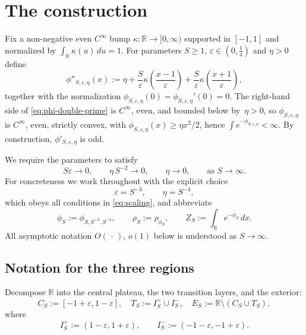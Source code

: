 \section{The construction}

Fix a non-negative even $C^\infty$ bump
$\kappa:\mathbb R\to[0,\infty)$ supported in $[-1,1]$ and normalized by
$\int_{\mathbb R}\kappa(u)\,du=1$. For parameters $S\ge 1$,
$\varepsilon\in(0,\tfrac14)$ and $\eta>0$ define
\begin{equation}\label{eq:phi-double-prime}
  \phi''_{S,\varepsilon,\eta}(x)
  :=\eta
  +\frac{S}{\varepsilon}\kappa\!\left(\frac{x-1}{\varepsilon}\right)
  +\frac{S}{\varepsilon}\kappa\!\left(\frac{x+1}{\varepsilon}\right),
\end{equation}
together with the normalization $\phi_{S,\varepsilon,\eta}(0)
=\phi_{S,\varepsilon,\eta}'(0)=0$. The right-hand side of
\eqref{eq:phi-double-prime} is $C^\infty$, even, and bounded below by~$\eta>0$,
so $\phi_{S,\varepsilon,\eta}$ is $C^\infty$, even, strictly convex, with
$\phi_{S,\varepsilon,\eta}(x)\ge\eta x^2/2$, hence
$\int e^{-\phi_{S,\varepsilon,\eta}}<\infty$. By construction,
$\phi'_{S,\varepsilon,\eta}$ is odd.

We require the parameters to satisfy
\begin{equation}\label{eq:scaling}
  S\varepsilon\to 0,\qquad \eta\,S^{-2}\to 0,\qquad \eta\to 0,
  \qquad\text{as }S\to\infty.
\end{equation}
For concreteness we work throughout with the explicit choice
\begin{equation}\label{eq:specific-choice}
  \varepsilon = S^{-3},\qquad \eta = S^{-4},
\end{equation}
which obeys all conditions in \eqref{eq:scaling}, and abbreviate
\[
  \phi_S:=\phi_{S,S^{-3},S^{-4}},\qquad
  \rho_S:=\rho_{\phi_S},\qquad
  Z_S:=\int_{\mathbb R}e^{-\phi_S}\,dx.
\]
All asymptotic notation $O(\,\cdot\,)$, $o(1)$ below is understood as
$S\to\infty$.

\subsection*{Notation for the three regions}

Decompose $\mathbb R$ into the central plateau, the two transition layers, and
the exterior:
\[
  C_S:=[-1+\varepsilon,1-\varepsilon],\quad
  T_S:=I_S^+\cup I_S^-,\quad
  E_S:=\mathbb R\setminus(C_S\cup T_S),
\]
where
\[
  I_S^+:=(1-\varepsilon,1+\varepsilon),\qquad I_S^-:=(-1-\varepsilon,-1+\varepsilon).
\]

